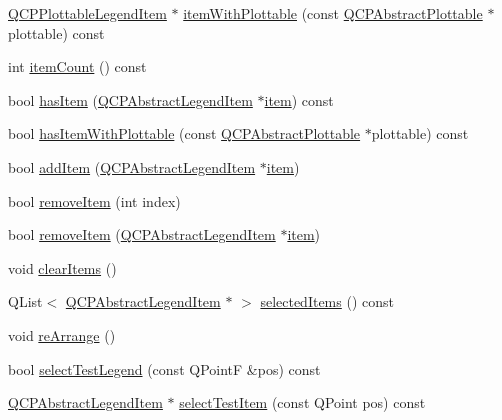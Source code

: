 \begin{DoxyCompactItemize}
\item 
\hyperlink{classQCPPlottableLegendItem}{Q\-C\-P\-Plottable\-Legend\-Item} $\ast$ \hyperlink{classQCPLegend_a5ee80cf83f65e3b6dd386942ee3cc1ee}{item\-With\-Plottable} (const \hyperlink{classQCPAbstractPlottable}{Q\-C\-P\-Abstract\-Plottable} $\ast$plottable) const 
\item 
int \hyperlink{classQCPLegend_a198228e9cdc78d3a3c306fa6763d0404}{item\-Count} () const 
\item 
bool \hyperlink{classQCPLegend_a380dd19eb631592e1ebb9b24cc5b398a}{has\-Item} (\hyperlink{classQCPAbstractLegendItem}{Q\-C\-P\-Abstract\-Legend\-Item} $\ast$\hyperlink{classQCPLegend_a454272d7094437beb3278a2294006da5}{item}) const 
\item 
bool \hyperlink{classQCPLegend_a2eb1d24bdf5658e64962a656303fd61a}{has\-Item\-With\-Plottable} (const \hyperlink{classQCPAbstractPlottable}{Q\-C\-P\-Abstract\-Plottable} $\ast$plottable) const 
\item 
bool \hyperlink{classQCPLegend_a3ab274de52d2951faea45a6d975e6b3f}{add\-Item} (\hyperlink{classQCPAbstractLegendItem}{Q\-C\-P\-Abstract\-Legend\-Item} $\ast$\hyperlink{classQCPLegend_a454272d7094437beb3278a2294006da5}{item})
\item 
bool \hyperlink{classQCPLegend_ac91595c3eaa746fe6321d2eb952c63bb}{remove\-Item} (int index)
\item 
bool \hyperlink{classQCPLegend_a2aea4ec6da2d454dd0b241a254d65082}{remove\-Item} (\hyperlink{classQCPAbstractLegendItem}{Q\-C\-P\-Abstract\-Legend\-Item} $\ast$\hyperlink{classQCPLegend_a454272d7094437beb3278a2294006da5}{item})
\item 
void \hyperlink{classQCPLegend_a24795c7250eb5214fcea16b7217b4dfb}{clear\-Items} ()
\item 
Q\-List$<$ \hyperlink{classQCPAbstractLegendItem}{Q\-C\-P\-Abstract\-Legend\-Item} $\ast$ $>$ \hyperlink{classQCPLegend_ac93eaf236e911d67aa8b88942ef45c5e}{selected\-Items} () const 
\item 
void \hyperlink{classQCPLegend_ad7fd50e5478b0da477d9cc74b7204caf}{re\-Arrange} ()
\item 
bool \hyperlink{classQCPLegend_a6388446e0906b21ebf3a92310570e73e}{select\-Test\-Legend} (const Q\-Point\-F \&pos) const 
\item 
\hyperlink{classQCPAbstractLegendItem}{Q\-C\-P\-Abstract\-Legend\-Item} $\ast$ \hyperlink{classQCPLegend_a8bbb0b003cc93f07dff1d69416b606f0}{select\-Test\-Item} (const Q\-Point pos) const 
\end{DoxyCompactItemize}
